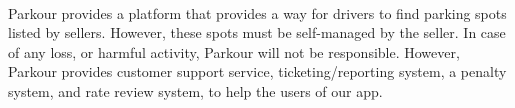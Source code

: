     \paragraph*{}
    Parkour provides a platform that provides a way for drivers to find parking spots listed by sellers. However, these spots must be self-managed by the seller. In case of any loss, or harmful activity, Parkour will not be responsible. However, Parkour provides customer support service, ticketing/reporting system, a penalty system, and rate review system, to help the users of our app.
